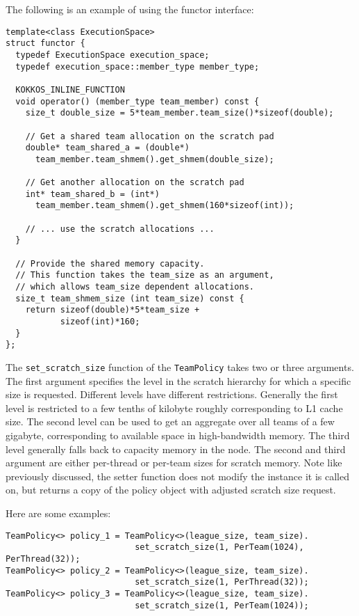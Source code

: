 The following is an example of using the functor interface:
\begin{lstlisting}
template<class ExecutionSpace>
struct functor {
  typedef ExecutionSpace execution_space;
  typedef execution_space::member_type member_type; 

  KOKKOS_INLINE_FUNCTION
  void operator() (member_type team_member) const {
    size_t double_size = 5*team_member.team_size()*sizeof(double);

    // Get a shared team allocation on the scratch pad
    double* team_shared_a = (double*)
      team_member.team_shmem().get_shmem(double_size);

    // Get another allocation on the scratch pad
    int* team_shared_b = (int*)
      team_member.team_shmem().get_shmem(160*sizeof(int));

    // ... use the scratch allocations ...
  }

  // Provide the shared memory capacity.
  // This function takes the team_size as an argument,
  // which allows team_size dependent allocations.
  size_t team_shmem_size (int team_size) const {
    return sizeof(double)*5*team_size +
           sizeof(int)*160;
  }
};
\end{lstlisting}

The \lstinline|set_scratch_size| function of the \lstinline|TeamPolicy| takes two or three arguments.
The first argument specifies the level in the scratch hierarchy for which a specific size is requested. 
Different levels have different restrictions. 
Generally the first level is restricted to a few tenths of kilobyte roughly corresponding to L1 cache size. 
The second level can be used to get an aggregate over all teams of a few gigabyte, corresponding to available 
space in high-bandwidth memory. 
The third level generally falls back to capacity memory in the node. 
The second and third argument are either per-thread or per-team sizes for scratch memory.
Note like previously discussed, the setter function does not modify the instance it is called on, but returns 
a copy of the policy object with adjusted scratch size request. 

Here are some examples:
\begin{lstlisting}
TeamPolicy<> policy_1 = TeamPolicy<>(league_size, team_size).
                          set_scratch_size(1, PerTeam(1024), PerThread(32));
TeamPolicy<> policy_2 = TeamPolicy<>(league_size, team_size).
                          set_scratch_size(1, PerThread(32));
TeamPolicy<> policy_3 = TeamPolicy<>(league_size, team_size).
                          set_scratch_size(1, PerTeam(1024));
\end{lstlisting} 

